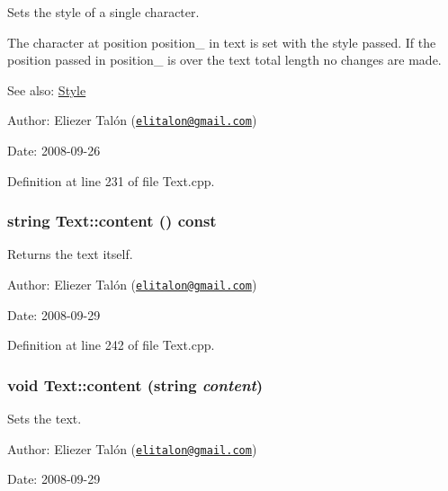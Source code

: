 Sets the style of a single character. 

The character at position position\_\- in text is set with the style passed. If the position passed in position\_\- is over the text total length no changes are made.

\begin{Desc}
\item[See also:]\hyperlink{class_style}{Style}\end{Desc}
\begin{Desc}
\item[Author:]Eliezer Talón (\href{mailto:elitalon@gmail.com}{\tt elitalon@gmail.com}) \end{Desc}
\begin{Desc}
\item[Date:]2008-09-26 \end{Desc}


Definition at line 231 of file Text.cpp.\hypertarget{class_text_8a29bbf6c707ac8b2055a22723a82f3d}{
\subsubsection[content]{\setlength{\rightskip}{0pt plus 5cm}string Text::content () const}}
\label{class_text_8a29bbf6c707ac8b2055a22723a82f3d}


Returns the text itself. 

\begin{Desc}
\item[Author:]Eliezer Talón (\href{mailto:elitalon@gmail.com}{\tt elitalon@gmail.com}) \end{Desc}
\begin{Desc}
\item[Date:]2008-09-29 \end{Desc}


Definition at line 242 of file Text.cpp.\hypertarget{class_text_7caede09aa76ca7fc26aab3ec3c41181}{
\subsubsection[content]{\setlength{\rightskip}{0pt plus 5cm}void Text::content (string {\em content})}}
\label{class_text_7caede09aa76ca7fc26aab3ec3c41181}


Sets the text. 

\begin{Desc}
\item[Author:]Eliezer Talón (\href{mailto:elitalon@gmail.com}{\tt elitalon@gmail.com}) \end{Desc}
\begin{Desc}
\item[Date:]2008-09-29 \end{Desc}


